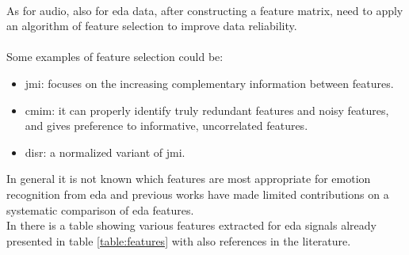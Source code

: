 \\ \indent
As for audio, also for \gls{eda} data, after constructing a feature matrix, need to apply an algorithm of feature selection to improve data reliability.
\\ \\
Some examples of feature selection could be:
\begin{itemize}
	\item \gls{jmi}: focuses on the increasing complementary information between features.
	\item \gls{cmim}: it can properly identify truly redundant features and noisy features, and gives preference to informative, uncorrelated features.
	\item \gls{disr}: a normalized variant of \gls{jmi}.
\end{itemize}
In general it is not known which features are most appropriate for emotion recognition from \gls{eda} and previous works have made limited contributions on a systematic comparison of \gls{eda} features.
\\
In \cite{shukla2019feature} there is a table showing various features extracted for \gls{eda} signals already presented in table \ref{table:features} with also references in the literature.